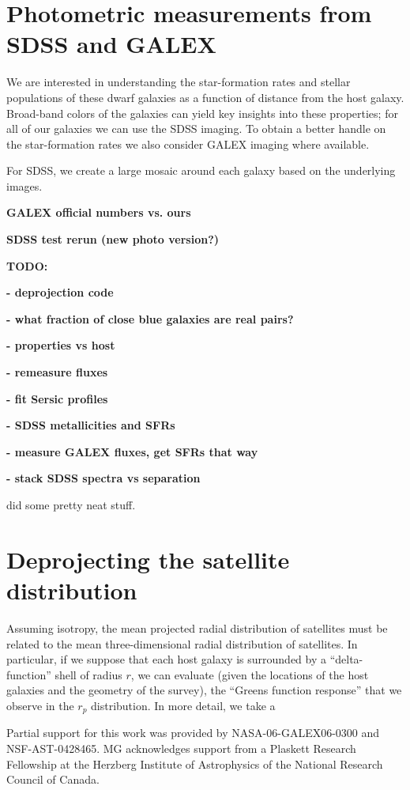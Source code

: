 \documentclass[10pt,preprint]{aastex}
\begin{document}
\section{ Photometric measurements from SDSS and GALEX}

We are interested in understanding the star-formation rates and
stellar populations of these dwarf galaxies as a function of distance
from the host galaxy.  Broad-band colors of the galaxies can yield key
insights into these properties; for all of our galaxies we can use the
SDSS imaging. To obtain a better handle on the star-formation rates we
also consider GALEX imaging where available.

For SDSS, we create a large mosaic around each galaxy based on the
underlying images. 


{\bf GALEX official numbers vs. ours}

{\bf SDSS test rerun (new photo version?)}

{\bf TODO:}

{\bf - deprojection code }

{\bf - what fraction of close blue galaxies are real pairs?}

{\bf - properties vs host }

{\bf - remeasure fluxes }

{\bf - fit Sersic profiles }

{\bf - SDSS metallicities and SFRs }

{\bf - measure GALEX fluxes, get SFRs that way }

{\bf - stack SDSS spectra vs separation }

\citet{blanton05a} did some pretty neat stuff.

\section{Deprojecting the satellite distribution}

Assuming isotropy, the mean projected radial distribution of
satellites must be related to the mean three-dimensional radial
distribution of satellites.  In particular, if we suppose that each
host galaxy is surrounded by a ``delta-function'' shell of radius $r$,
we can evaluate (given the locations of the host galaxies and the
geometry of the survey), the ``Greens function response'' that we
observe in the $r_p$ distribution. In more detail, we take a


\acknowledgments

Partial support for this work was provided by NASA-06-GALEX06-0300 and
NSF-AST-0428465.  MG acknowledges support from a Plaskett Research
Fellowship at the Herzberg Institute of Astrophysics of the National
Research Council of Canada. 
\end{document}
